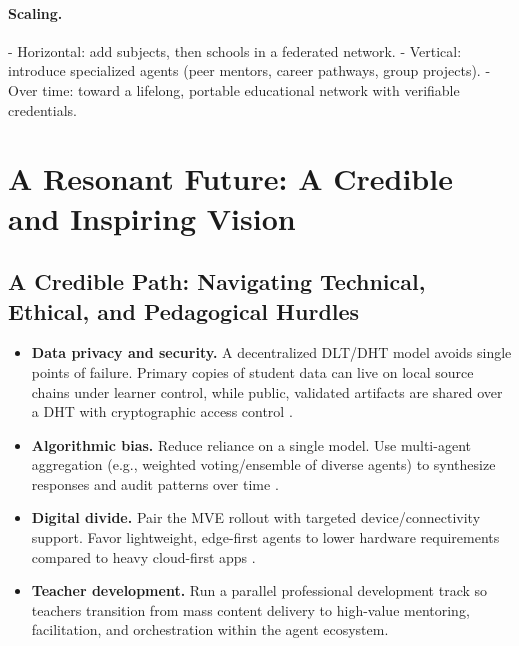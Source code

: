 \documentclass[12pt,a4paper]{article}
\begin{document}
\paragraph{Scaling.}
- Horizontal: add subjects, then schools in a federated network.
- Vertical: introduce specialized agents (peer mentors, career pathways, group projects).
- Over time: toward a lifelong, portable educational network with verifiable credentials.

\section{A Resonant Future: A Credible and Inspiring Vision}

\subsection{A Credible Path: Navigating Technical, Ethical, and Pedagogical Hurdles}
\begin{itemize}[leftmargin=1.2em]
  \item \textbf{Data privacy and security.} A decentralized DLT/DHT model avoids single points of failure. Primary copies of student data can live on local source chains under learner control, while public, validated artifacts are shared over a DHT with cryptographic access control \autocite{holochain,moonlight_symphony}.
  \item \textbf{Algorithmic bias.} Reduce reliance on a single model. Use multi-agent aggregation (e.g., weighted voting/ensemble of diverse agents) to synthesize responses and audit patterns over time \autocite{moonlight_symphony,wang2025}.
  \item \textbf{Digital divide.} Pair the MVE rollout with targeted device/connectivity support. Favor lightweight, edge-first agents to lower hardware requirements compared to heavy cloud-first apps \autocite{moonlight_symphony}.
  \item \textbf{Teacher development.} Run a parallel professional development track so teachers transition from mass content delivery to high-value mentoring, facilitation, and orchestration within the agent ecosystem.
\end{itemize}
\end{document}
